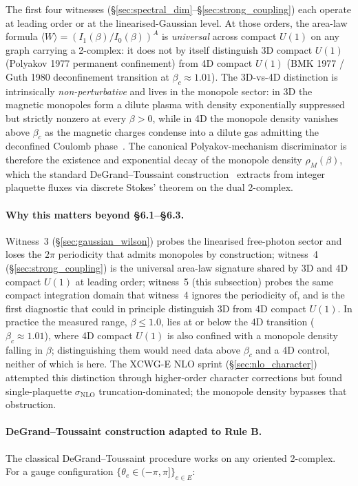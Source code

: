 \documentclass[11pt]{article}
\begin{document}
The first four witnesses (\S\ref{sec:spectral_dim}--\S\ref{sec:strong_coupling})
each operate at leading order or at the linearised-Gaussian level. At those
orders, the area-law formula
$\langle W\rangle = (I_1(\beta)/I_0(\beta))^A$ is \emph{universal} across
compact $U(1)$ on any graph carrying a 2-complex: it does not by itself
distinguish 3D compact $U(1)$ (Polyakov 1977 permanent confinement) from 4D
compact $U(1)$ (BMK 1977 / Guth 1980 deconfinement transition at
$\beta_c\approx 1.01$). The 3D-vs-4D distinction is intrinsically
\emph{non-perturbative} and lives in the monopole sector: in 3D the magnetic
monopoles form a dilute plasma with density exponentially suppressed but
strictly nonzero at every $\beta>0$, while in 4D the monopole density
vanishes above $\beta_c$ as the magnetic charges condense into a dilute gas
admitting the deconfined Coulomb phase~\cite{polyakov1977,banks_myerson_kogut1977,guth1980}.
The canonical Polyakov-mechanism discriminator is therefore the existence and
exponential decay of the monopole density $\rho_M(\beta)$, which the standard
DeGrand--Toussaint construction~\cite{degrand_toussaint1980} extracts from
integer plaquette fluxes via discrete Stokes' theorem on the dual 2-complex.

\paragraph{Why this matters beyond §6.1--§6.3.} Witness~3
(\S\ref{sec:gaussian_wilson}) probes the linearised free-photon sector and
loses the $2\pi$ periodicity that admits monopoles by construction;
witness~4 (\S\ref{sec:strong_coupling}) is the universal area-law signature
shared by 3D and 4D compact $U(1)$ at leading order; witness~5 (this
subsection) probes the same compact integration domain that witness~4 ignores
the periodicity of, and is the first diagnostic that could in principle
distinguish 3D from 4D compact $U(1)$.  In practice the measured range,
$\beta \le 1.0$, lies at or below the 4D transition
($\beta_c \approx 1.01$), where 4D compact $U(1)$ is also confined with a
monopole density falling in $\beta$; distinguishing them would need data
above $\beta_c$ and a 4D control, neither of which is here. The XCWG-E NLO sprint
(\S\ref{sec:nlo_character}) attempted this distinction through higher-order
character corrections but found single-plaquette $\sigma_\text{NLO}$
truncation-dominated; the monopole density bypasses that obstruction.

\paragraph{DeGrand--Toussaint construction adapted to Rule B.} The classical
DeGrand--Toussaint procedure works on any oriented 2-complex. For a gauge
configuration $\{\theta_e\in(-\pi,\pi]\}_{e\in E}$:
\end{document}
